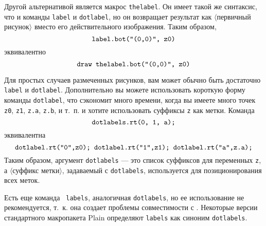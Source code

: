 \documentclass{article} %
\newcommand\qq{"} %
\newcommand\invisgap{\nobreak\hskip0pt\relax}
\newcommand\tdescr[1]{$\langle$\invisgap#1\invisgap$\rangle$}
\begin{document}
Другой альтернативой является макрос {\tt thelabel}\label{Dthelab}. 
Он имеет такой же синтаксис, что и команды {\tt label} и {\tt dotlabel}, но 
он возвращает результат как \tdescr{первичный рисунок} вместо его 
действительного изображения.
Таким образом, 
$$ \hbox{\tt label.bot(\qq(0,0)\qq, z0)} $$
эквивалентно
$$ \hbox{\tt draw thelabel.bot(\qq(0,0)\qq, z0)} $$

Для простых случаев размеченных рисунков, вам может обычно быть достаточно 
{\tt label} и {\tt dotlabel}.
Дополнительно вы можете использовать короткую форму команды {\tt dotlabel}, 
что сэкономит много времени, когда вы имеете много точек {\tt z0}, {\tt z1}, 
{\tt z.a}, {\tt z.b}, и т.~п. и хотите использовать суффиксы {\tt z} как метки. 
Команда \label{Ddotlbs}
$$ \hbox{\tt dotlabels.rt(0, 1, a);} $$
эквивалентна 
$$ \hbox{\tt dotlabel.rt(\qq0\qq,z0); dotlabel.rt(\qq1\qq,z1); dotlabel.rt({\qq}a{\qq},z.a);} $$
Таким образом, аргумент {\tt dotlabels} --- это список суффиксов для 
переменных {\tt z}, а \tdescr{суффикс метки}, задаваемый с {\tt dotlabels}, 
используется для позиционирования всех меток.

Есть еще команда {\tt
labels}\label{Dlabels}, аналогичная 
{\tt dotlabels}, но ее использование не рекомендуется, т.~к. она создает 
проблемы совместимости с \MF{}. 
Некоторые версии стандартного макропакета Plain определяют 
{\tt labels} как синоним {\tt dotlabels}.
\end{document}
